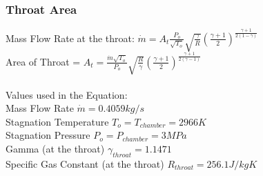 \documentclass[12pt, letter paper]{article}
\begin{document}
			\subsubsection{Throat Area}
				Mass Flow Rate at the throat: $ \dot{m} = A_t \frac{P_o}{\sqrt{T_o}}\sqrt{\frac{\gamma}{R}} (\frac{\gamma + 1}{2})^{\frac{\gamma + 1}{2(1-\gamma)}}  $ \\
				Area of Throat = $ A_t = \frac{\dot{m}\sqrt{T_o}}{P_o}\sqrt{\frac{R}{\gamma}} (\frac{\gamma + 1}{2})^{\frac{\gamma + 1}{2(\gamma -1)}}$ \\ \\
				Values used in the Equation: \\
				Mass Flow Rate $ \dot{m} = 0.4059 kg/s $ \\
				Stagnation Temperature $ T_o = T_{chamber} = 2966 K $ \\
				Stagnation Pressure $ P_o = P_{chamber} = 3 MPa $ \\
				Gamma (at the throat) $ \gamma_{throat} = 1.1471 $ \\
				Specific Gas Constant (at the throat) $ R_{throat} = 256.1 J/kgK $ \\
			

			
		
\end{document}
